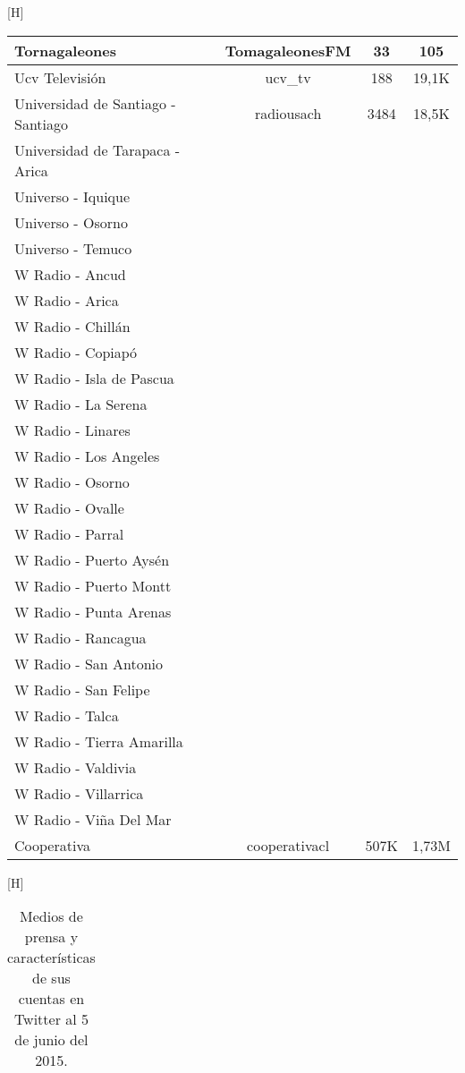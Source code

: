 \begin{center}[H]
\begin{longtable}{| l | c | c | c |}
Tornagaleones	&	TomagaleonesFM	&	33	&	105	\\ \hline
Ucv Televisión	&	ucv\_tv	&	188	&	19,1K	\\ \hline
Universidad de Santiago - Santiago	&	radiousach	&	3484	&	18,5K	\\ \hline
Universidad de Tarapaca - Arica	&		&		&		\\ \hline
Universo - Iquique	&		&		&		\\ \hline
Universo - Osorno	&		&		&		\\ \hline
Universo - Temuco	&		&		&		\\ \hline
W Radio - Ancud	&		&		&		\\ \hline
W Radio - Arica	&		&		&		\\ \hline
W Radio - Chillán	&		&		&		\\ \hline
W Radio - Copiapó	&		&		&		\\ \hline
W Radio - Isla de Pascua	&		&		&		\\ \hline
W Radio - La Serena	&		&		&		\\ \hline
W Radio - Linares	&		&		&		\\ \hline
W Radio - Los Angeles	&		&		&		\\ \hline
W Radio - Osorno	&		&		&		\\ \hline
W Radio - Ovalle	&		&		&		\\ \hline
W Radio - Parral	&		&		&		\\ \hline
W Radio - Puerto Aysén	&		&		&		\\ \hline
W Radio - Puerto Montt	&		&		&		\\ \hline
W Radio - Punta Arenas	&		&		&		\\ \hline
W Radio - Rancagua	&		&		&		\\ \hline
W Radio - San Antonio	&		&		&		\\ \hline
W Radio - San Felipe	&		&		&		\\ \hline
W Radio - Talca	&		&		&		\\ \hline
W Radio - Tierra Amarilla	&		&		&		\\ \hline
W Radio - Valdivia	&		&		&		\\ \hline
W Radio - Villarrica	&		&		&		\\ \hline
W Radio - Viña Del Mar	&		&		&		\\ \hline
Cooperativa	&	cooperativacl	&	507K	&	1,73M	\\ \hline
	\end{longtable}
\end{center}

\begin{center}[H]
	\centering
	\begin{longtable}{| l | c | c | c |}
		\caption {Medios de prensa y características de sus cuentas en Twitter al 5 de junio del 2015.}
		\label{table:archiMedios}
		\hline
		
	\end{longtable}
\end{center}